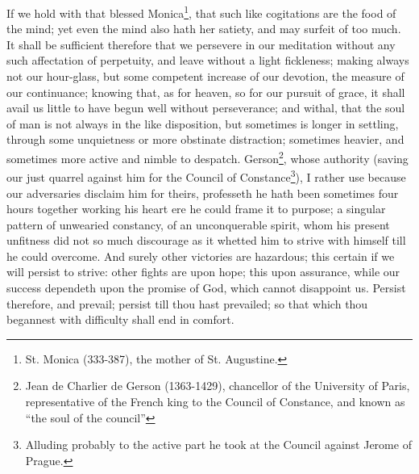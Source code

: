 If we hold with that blessed Monica\footnote{St. Monica (333-387), the mother of St. Augustine.\cite{cath1913}}, that such like cogitations are the food of the mind; yet even the mind also hath her satiety, and may surfeit of too much. It shall be sufficient therefore that we persevere in our meditation without any such affectation of perpetuity, and leave without a light fickleness; making always not our hour-glass, but some competent increase of our devotion, the measure of our continuance; knowing that, as for heaven, so for our pursuit of grace, it shall avail us little to have begun well without perseverance; and withal, that the soul of man is not always in the like disposition, but sometimes is longer in settling, through some unquietness or more obstinate distraction; sometimes heavier, and sometimes more active and nimble to despatch. Gerson\footnote{Jean de Charlier de Gerson (1363-1429), chancellor of the University of Paris, representative of the French king to the Council of Constance, and known as ``the soul of the council''\cite{cath1913}}, whose authority (saving our just quarrel against him for the Council of Constance\footnote{Alluding probably to the active part he took at the Council against Jerome of Prague.\cite{lenf1714}}), I rather use because our adversaries disclaim him for theirs, professeth he hath been sometimes four hours together working his heart ere he could frame it to purpose; a singular pattern of unwearied constancy, of an unconquerable spirit, whom his present unfitness did not so much discourage as it whetted him to strive with himself till he could overcome. And surely other victories are hazardous; this certain if we will persist to strive: other fights are upon hope; this upon assurance, while our success dependeth upon the promise of God, which cannot disappoint us. Persist therefore, and prevail; persist till thou hast prevailed; so that which thou begannest with difficulty shall end in comfort. 
